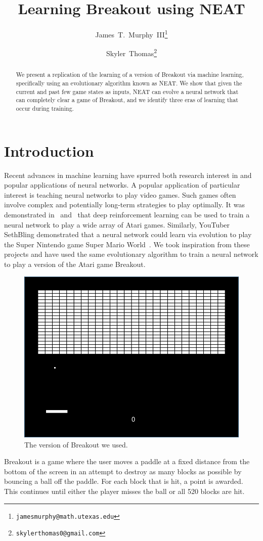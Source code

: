 \documentclass[letterpaper, twocolumn]{article}
\author{James~T.~Murphy~III\thanks{\texttt{jamesmurphy@math.utexas.edu}}\and{}Skyler~Thomas\thanks{\texttt{skylerthomas0@gmail.com}}}
\title{Learning Breakout using NEAT}
\begin{document}
\maketitle{}
\begin{abstract}
    We present a replication of the learning of a version of
    Breakout via machine learning, specifically using an evolutionary algorithm known as NEAT.
    We show that given the current and past few game states as inputs, NEAT
    can evolve a neural network that can completely clear a game of Breakout,
    and we identify three eras of learning that occur during training.
\end{abstract}

\section{Introduction}

Recent advances in machine learning have spurred both research interest in and popular applications
of neural networks.
A popular application of particular interest is teaching neural networks to play video games.
Such games often involve complex and potentially long-term strategies to play optimally.
It was demonstrated in~\cite{mnih2013playing} and~\cite{mnih2015human} that deep reinforcement learning can be used to train a neural network
to play a wide array of Atari games.
Similarly, YouTuber SethBling demonstrated that a neural network could learn via evolution to play the Super Nintendo game Super Mario World~\cite{sethbling2015}.
We took inspiration from these projects and have used the same evolutionary algorithm to train a neural network
to play a version of the Atari game Breakout.

\begin{figure}[ht!]
    \centering
    \includegraphics[width=.45\textwidth]{breakout.png}
    \caption{The version of Breakout we used.}
\end{figure}

Breakout is a game where the user moves a paddle at a fixed distance
from the bottom of the screen in an attempt to destroy as many blocks as possible
by bouncing a ball off the paddle.
For each block that is hit, a point is awarded.
This continues until either the player misses the ball or all 520 blocks are hit.
\end{document}
